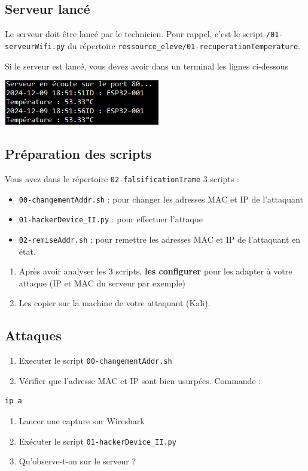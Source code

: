 \documentclass[french, 12pt]{article}%
\newcommand{\itemE}{\item[$\bullet$]}
\begin{document}
\subsection{Serveur lancé}
\label{srvLance}

Le serveur doit être lancé par le technicien. Pour rappel, c'est le script \verb?/01-serveurWifi.py? du répertoire \verb?ressource_eleve/01-recuperationTemperature?. 

Si le serveur est lancé, vous devez avoir dans un terminal les lignes ci-dessous

\begin{center}
\includegraphics[scale=0.7]{./ressource/serveurLance.png}
\end{center}


\subsection{Préparation des scripts}
\label{prepaScript}

Vous avez dans le répertoire \verb?02-falsificationTrame? 3 scripts :   
\begin{itemize}
\itemE \verb?00-changementAddr.sh? : pour changer les adresses MAC et IP de l'attaquant
\itemE \verb?01-hackerDevice_II.py? : pour effectuer l'attaque
\itemE \verb?02-remiseAddr.sh? : pour remettre les adresses MAC et IP de l'attaquant en état. 
\end{itemize}

\begin{enumerate}[resume]
\item Après avoir analyser les 3 scripts, \textbf{les configurer} pour les adapter à votre attaque (IP et MAC du serveur par exemple)
\item Les copier sur la machine de votre attaquant (Kali). 
\end{enumerate}

\subsection{Attaques}
\label{attaque}

\begin{enumerate}[resume]
\item Executer le script \verb?00-changementAddr.sh?
\item Vérifier que l'adresse MAC et IP sont bien usurpées. Commande :
\end{enumerate}
\begin{lstlisting}[style=commande]
ip a
\end{lstlisting}
\begin{enumerate}[resume]
\item Lancer une capture sur Wireshark
\item Exécuter le script \verb?01-hackerDevice_II.py?
\item Qu'observe-t-on sur le serveur ? 
\end{enumerate}
\end{document}
